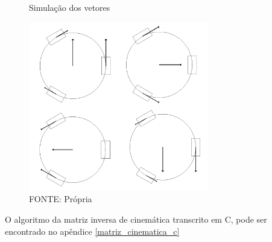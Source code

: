 \begin{figure}[ht]
	\centering
	\caption{Simulação dos vetores}
	\includegraphics[width=0.7\textwidth]{figures/simulacao}
	\caption*{FONTE: Própria}
	\label{simulacao}
\end{figure}

O algoritmo da matriz inversa de cinemática transcrito em C, pode ser encontrado no apêndice \ref{matriz_cinematica_c}